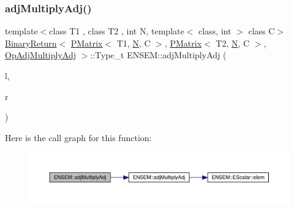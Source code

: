 \subsubsection{\texorpdfstring{adjMultiplyAdj()}{adjMultiplyAdj()}\hspace{0.1cm}{\footnotesize\ttfamily [3/3]}}
{\footnotesize\ttfamily template$<$class T1 , class T2 , int N, template$<$ class, int $>$ class C$>$ \\
\mbox{\hyperlink{structENSEM_1_1BinaryReturn}{Binary\+Return}}$<$ \mbox{\hyperlink{classENSEM_1_1PMatrix}{P\+Matrix}}$<$ T1, \mbox{\hyperlink{operator__name__util_8cc_a7722c8ecbb62d99aee7ce68b1752f337}{N}}, C $>$, \mbox{\hyperlink{classENSEM_1_1PMatrix}{P\+Matrix}}$<$ T2, \mbox{\hyperlink{operator__name__util_8cc_a7722c8ecbb62d99aee7ce68b1752f337}{N}}, C $>$, \mbox{\hyperlink{structENSEM_1_1OpAdjMultiplyAdj}{Op\+Adj\+Multiply\+Adj}} $>$\+::Type\+\_\+t E\+N\+S\+E\+M\+::adj\+Multiply\+Adj (\begin{DoxyParamCaption}\item[{const \mbox{\hyperlink{classENSEM_1_1PMatrix}{P\+Matrix}}$<$ T1, \mbox{\hyperlink{operator__name__util_8cc_a7722c8ecbb62d99aee7ce68b1752f337}{N}}, C $>$ \&}]{l,  }\item[{const \mbox{\hyperlink{classENSEM_1_1PMatrix}{P\+Matrix}}$<$ T2, \mbox{\hyperlink{operator__name__util_8cc_a7722c8ecbb62d99aee7ce68b1752f337}{N}}, C $>$ \&}]{r }\end{DoxyParamCaption})\hspace{0.3cm}{\ttfamily [inline]}}

Here is the call graph for this function\+:\nopagebreak
\begin{figure}[H]
\begin{center}
\leavevmode
\includegraphics[width=350pt]{df/d0a/group__primmatrix_ga81c788e54ea0f4c4de97e7bfa9d7cd89_cgraph}
\end{center}
\end{figure}
\mbox{\label{group__primmatrix_ga895c61e14c8d4206a949f44e36add5c6}} 
